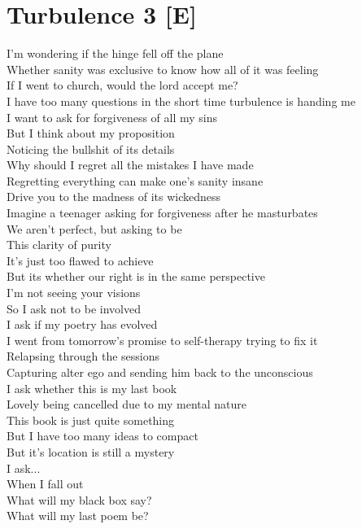 \documentclass[12pt, b5paper, oneside]{book}
\begin{document}
\section{Turbulence 3 [E]}
I'm wondering if the hinge fell off the plane 
\\Whether sanity was exclusive to know how all of it was feeling
\\If I went to church, would the lord accept me?
\\I have too many questions in the short time turbulence is handing me
\\I want to ask for forgiveness of all my sins
\\But I think about my proposition
\\Noticing the bullshit of its details
\\Why should I regret all the mistakes I have made
\\Regretting everything can make one's sanity insane
\\Drive you to the madness of its wickedness 
\\Imagine a teenager asking for forgiveness after he masturbates
\\We aren't perfect, but asking to be
\\This clarity of purity
\\It's just too flawed to achieve
\\But its whether our right is in the same perspective
\\I'm not seeing your visions
\\So I ask not to be involved 
\\I ask if my poetry has evolved
\\I went from tomorrow's promise to self-therapy trying to fix it
\\Relapsing through the sessions
\\Capturing alter ego and sending him back to the unconscious
\\I ask whether this is my last book
\\Lovely being cancelled due to my mental nature 
\\This book is just quite something 
\\But I have too many ideas to compact
\\But it's location is still a mystery
\\I ask...
\\When I fall out 
\\What will my black box say?
\\What will my last poem be?
\newpage
\end{document}
